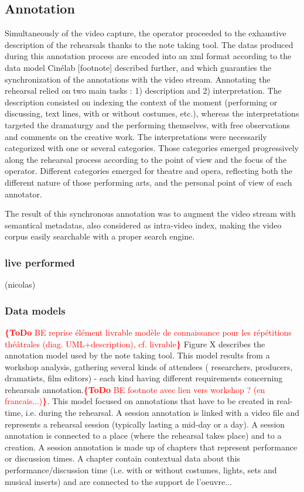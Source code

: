 \documentclass[conference]{IEEEtran}
\newcommand{\todo}[1]{\noindent\textcolor{red}{{\bf \{ToDo} #1{\bf \}}}}
\begin{document}
\subsection{Annotation}
Simultaneously of the video capture, the operator proceeded to the exhaustive description of the rehearsals thanks to the note taking tool. The datas produced during this annotation process are encoded into an xml format according to the data model Cinélab [footnote] described further, and which guaranties the synchronization of the annotations with the video stream. 
Annotating the rehearsal relied on two main tasks : 1) description and 2) interpretation. The description consisted on indexing the context of the moment (performing or discussing, text lines, with or without costumes, etc.), whereas the interpretations targeted the dramaturgy and the performing themselves, with free observations and comments on the creative work. The interpretations were necessarily categorized with one or several categories. Those categories emerged progressively along the rehearsal process according to the point of view and the focus of the operator. 
Different categories emerged for theatre and opera, reflecting both the different nature of those performing arts, and the personal point of view of each annotator.

The result of this synchronous annotation was to augment the video stream with semantical metadatas, also considered as intra-video index, making the video corpus easily searchable with a proper search engine.
\subsubsection{live performed} (nicolas)

\subsubsection{Data models}
\todo{BE reprise élément livrable modèle de connaissance pour les répétitions théâtrales (diag. UML+description), cf. livrable}
Figure X describes the annotation model used by the note taking tool. This model results from a workshop analysis, gathering several kinds of attendees ( researchers, producers, dramatists, film editors) - each kind having different requirements concerning rehearsals annotation.\todo{BE footnote avec lien vers workshop ? (en francais...)}. This model focused on annotations that have to be created in real-time, i.e. during the rehearsal.
A session annotation is linked with a video file and represents a rehearsal session (typically lasting a mid-day or a day). A session annotation is connected to a place (where the rehearsal takes place) and to a creation. A session annotation is made up of chapters that represent performance or discussion times. A chapter contain contextual data about this performance/discussion time (i.e. with or without costumes, lights, sets and musical inserts) and are connected to the support de l'oeuvre...
\end{document}
